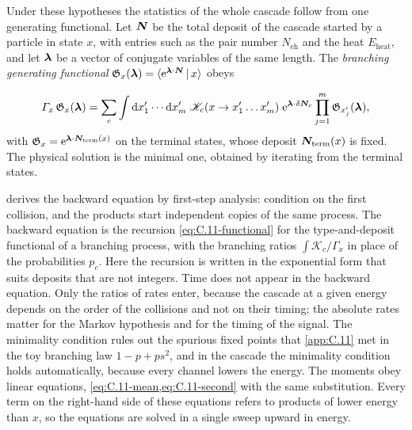 Under these hypotheses the statistics of the whole cascade follow from one generating functional. Let $\bm{N}$ be the total deposit of the cascade started by a particle in state $x$, with entries such as the pair number $N_{\mathrm{eh}}$ and the heat $E_{\mathrm{heat}}$, and let $\bm{\lambda}$ be a vector of conjugate variables of the same length. The \emph{branching generating functional} $\mathfrak{G}_x(\bm{\lambda}) = \langle\mathrm{e}^{\bm{\lambda}\cdot\bm{N}}\,|\,x\rangle$ obeys
\begin{keyresult}
\begin{equation}
  \varGamma_x\,\mathfrak{G}_x(\bm{\lambda}) = \sum_c\int\mathrm{d} x'_1\cdots\mathrm{d} x'_m\;\mathscr{K}_c(x \to x'_1\dots x'_m)\;\mathrm{e}^{\bm{\lambda}\cdot\delta\bm{N}_c}\prod_{j=1}^m\mathfrak{G}_{x'_j}(\bm{\lambda}) ,
  \label{eq:18.1-backward}
\end{equation}
with $\mathfrak{G}_x = \mathrm{e}^{\bm{\lambda}\cdot\bm{N}_{\mathrm{term}}(x)}$ on the terminal states, whose deposit $\bm{N}_{\mathrm{term}}(x)$ is fixed. The physical solution is the minimal one, obtained by iterating from the terminal states.
\end{keyresult}
\noindent {} derives the backward equation by first-step analysis: condition on the first collision, and the products start independent copies of the same process. The backward equation is the recursion \cref{eq:C.11-functional} for the type-and-deposit functional of a branching process, with the branching ratios $\int\mathscr{K}_c/\varGamma_x$ in place of the probabilities $p_c$. Here the recursion is written in the exponential form that suits deposits that are not integers. Time does not appear in the backward equation. Only the ratios of rates enter, because the cascade at a given energy depends on the order of the collisions and not on their timing; the absolute rates matter for the Markov hypothesis and for the timing of the signal. The minimality condition rules out the spurious fixed points that \cref{app:C.11} met in the toy branching law $1 - p + ps^2$, and in the cascade the minimality condition holds automatically, because every channel lowers the energy. The moments obey linear equations, \cref{eq:C.11-mean,eq:C.11-second} with the same substitution. Every term on the right-hand side of these equations refers to products of lower energy than $x$, so the equations are solved in a single sweep upward in energy.

